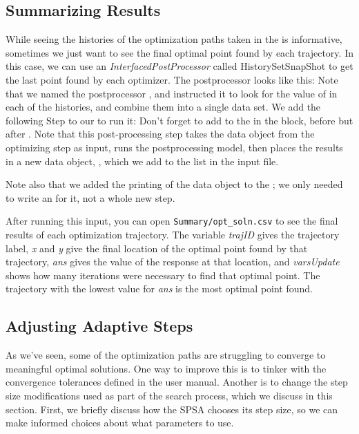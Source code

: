 \subsection{Summarizing Results} \label{subsec:opt summarizing results}
While seeing the histories of the optimization paths taken in the  is informative,
sometimes we just want to see the final optimal point found by each trajectory.  In this case, we can use an
\emph{InterfacedPostProcessor} called {HistorySetSnapShot} to get the last point found by each optimizer.  The
postprocessor looks like this:
Note that we named the postprocessor , and instructed it to look for the 
value of  in each of the histories, and combine them into a single data set.  We add the
following Step to our  to run it:
Don't forget to add  to the  in the  block, before
 but after .  Note that this post-processing step takes the
 data object from the optimizing step as input, runs the postprocessing model, then
places the results in a new data object, , which we add to the 
list in the input file.

Note also that we added the printing of the  data object to the 
; we only needed to write an  for it, not a whole new step.

After running this input, you can open \texttt{Summary/opt\_soln.csv} to see the final results of each
optimization trajectory.  The variable \emph{trajID} gives the trajectory label, \emph{x} and \emph{y} give
the final location of the optimal point found by that trajectory, \emph{ans} gives the value of the response
at that location, and \emph{varsUpdate} shows how many iterations were necessary to find that optimal point.
The trajectory with the lowest value for \emph{ans} is the most optimal point found.

\subsection{Adjusting Adaptive Steps} \label{subsec:opt stepsize}
As we've seen, some of the optimization paths are struggling to converge to meaningful optimal solutions.
One way to improve this is to tinker with the convergence tolerances defined in the user manual.  Another is
to change the step size modifications used as part of the search process, which we discuss in this section.
First, we briefly discuss how the SPSA chooses its step size, so we can make informed choices about what
parameters to use.

